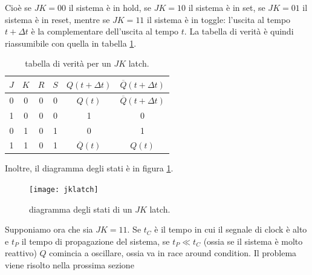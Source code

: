 \documentclass[a4paper, 11pt]{article}
\begin{document}
Cioè se $JK=00$ il sistema è in hold, se $JK=10$ il sistema è in set, se $JK=01$ il sistema è in reset, mentre se $JK=11$ il sistema è in toggle: l'uscita al tempo $t+\Delta t$ è la complementare dell'uscita al tempo $t$. La tabella di verità è quindi riassumibile con quella in tabella \ref{tab:shortjk}.
\begin{table}[h!]
	\centering
	\begin{tabular}{c c| c c| c c}
		$J$&$K$&$R$&$S$&$Q(t+\Delta t)$&$\overline{Q}(t+\Delta t)$\\\hline 0&0&0&0&$Q(t)$&$\overline{Q}(t+\Delta t)$\\1&0&0&0&1&0\\0&1&0&1&0&1\\1&1&0&1&$\overline{Q}(t)$&$Q(t)$
	\end{tabular}
	\caption{tabella di verità per un $JK$ latch.}
	\label{tab:shortjk}
\end{table}
Inoltre, il diagramma degli stati è in figura \ref{fig:jklatchdiagstati}.
\begin{figure}[h!]
	\centering
	\texttt{[image: jklatch]}
	\caption{diagramma degli stati di un $JK$ latch.}
	\label{fig:jklatchdiagstati}
\end{figure}
Supponiamo ora che sia $JK=11$. Se $t_C$ è il tempo in cui il segnale di clock è alto e $t_P$ il tempo di propagazione del sistema, se $t_P\ll t_C$ (ossia se il sistema è molto reattivo) $Q$ comincia a oscillare, ossia va in race around condition. Il problema viene risolto nella prossima sezione
\end{document}
